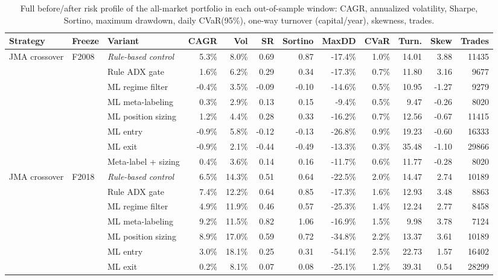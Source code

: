 \begin{longtable}{p{2.2cm} l p{2.6cm} r r r r r r r r r}
\caption{Full before/after risk profile of the all-market portfolio in each out-of-sample window: CAGR, annualized volatility, Sharpe, Sortino, maximum drawdown, daily CVaR(95\%), one-way turnover (capital/year), skewness, trades.} \label{tab:s2metrics} \\
\toprule
Strategy & Freeze & Variant & CAGR & Vol & SR & Sortino & MaxDD & CVaR & Turn. & Skew & Trades \\
\midrule
\endhead
\bottomrule
\endfoot
JMA crossover & F2008 & \textit{Rule-based control} & 5.3\% & 8.0\% & 0.69 & 0.87 & -17.4\% & 1.0\% & 14.01 & 3.88 & 11435 \\
 &  & Rule ADX gate & 1.6\% & 6.2\% & 0.29 & 0.34 & -17.3\% & 0.7\% & 11.80 & 3.16 & 9677 \\
 &  & ML regime filter & -0.4\% & 3.5\% & -0.09 & -0.10 & -14.6\% & 0.5\% & 10.95 & -1.27 & 9279 \\
 &  & ML meta-labeling & 0.3\% & 2.9\% & 0.13 & 0.15 & -9.4\% & 0.5\% & 9.47 & -0.26 & 8020 \\
 &  & ML position sizing & 1.2\% & 4.4\% & 0.28 & 0.33 & -16.2\% & 0.7\% & 12.56 & -0.67 & 11415 \\
 &  & ML entry & -0.9\% & 5.8\% & -0.12 & -0.13 & -26.8\% & 0.9\% & 19.23 & -0.60 & 16333 \\
 &  & ML exit & -0.9\% & 2.1\% & -0.44 & -0.49 & -13.3\% & 0.3\% & 35.48 & -1.10 & 29866 \\
 &  & Meta-label + sizing & 0.4\% & 3.6\% & 0.14 & 0.16 & -11.7\% & 0.6\% & 11.77 & -0.28 & 8020 \\
JMA crossover & F2018 & \textit{Rule-based control} & 6.5\% & 14.3\% & 0.51 & 0.64 & -22.5\% & 2.0\% & 14.47 & 2.74 & 10189 \\
 &  & Rule ADX gate & 7.4\% & 12.2\% & 0.64 & 0.85 & -17.3\% & 1.6\% & 12.93 & 3.48 & 8863 \\
 &  & ML regime filter & 4.9\% & 11.9\% & 0.46 & 0.57 & -25.3\% & 1.4\% & 12.24 & 2.77 & 8458 \\
 &  & ML meta-labeling & 9.2\% & 11.5\% & 0.82 & 1.06 & -16.9\% & 1.5\% & 9.98 & 3.78 & 7124 \\
 &  & ML position sizing & 8.9\% & 17.0\% & 0.59 & 0.72 & -34.8\% & 2.2\% & 13.37 & 3.61 & 10189 \\
 &  & ML entry & 3.0\% & 18.1\% & 0.25 & 0.31 & -54.1\% & 2.5\% & 22.73 & 1.57 & 16402 \\
 &  & ML exit & 0.2\% & 8.1\% & 0.07 & 0.08 & -25.1\% & 1.2\% & 39.31 & 0.54 & 28299 \\

\end{longtable}
